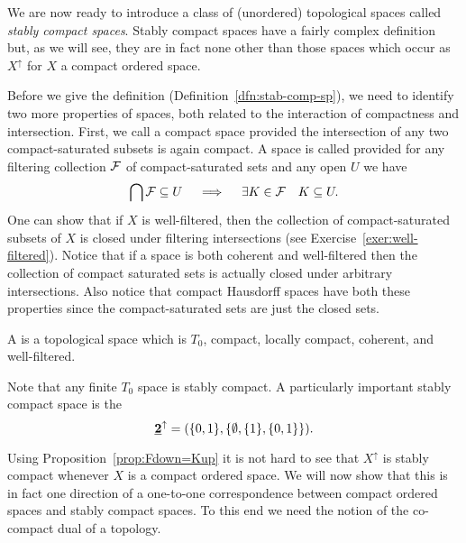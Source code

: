 We are now ready to introduce a class of (unordered) topological spaces called \emph{stably compact spaces}. Stably compact spaces have a fairly complex definition but, as we will see, they are in fact none other than those spaces which occur as $X^{\uparrow}$ for $X$ a compact ordered space.

Before we give the definition (Definition~\ref{dfn:stab-comp-sp}), we need to identify two more properties of spaces, both related to the interaction of compactness and intersection. First, we call a compact space  provided the intersection of any two compact-saturated subsets is again compact. A space is called  provided for any filtering collection $\mathcal{F}$ of compact-saturated sets and any open $U$ we have
 \[\bigcap\mathcal{F}\subseteq U \quad \implies \quad \exists K\in\mathcal{F}\quad K\subseteq U.\]
One can show that if $X$ is well-filtered, then the collection of compact-saturated subsets of $X$ is closed under filtering intersections (see Exercise~\ref{exer:well-filtered}).  Notice that if a space is both coherent and well-filtered then the collection of compact saturated sets is actually closed under arbitrary intersections. Also notice that compact Hausdorff spaces have both these properties since the compact-saturated sets are just the closed sets.

\begin{definition}\label{dfn:stab-comp-sp}
 A  is a topological space which is $T_0$, compact, locally compact, coherent, and well-filtered.
\end{definition}
 
 \begin{example}\label{ex:Sierpinski}
 Note that any finite $T_0$ space is stably compact. A particularly important stably compact space is the 
 \[
 \underline{\bf 2}^\uparrow=(\{0,1\},\{\emptyset,\{1\},\{0,1\}\}).
 \]
 \end{example}
 
 Using Proposition~\ref{prop:Fdown=Kup} it is not hard to see that $X^\uparrow$ is stably compact whenever $X$ is a compact ordered space. We will now show that this is in fact one direction of a one-to-one correspondence between compact ordered spaces and stably compact spaces. To this end we need the notion of the co-compact dual of a topology.
 
